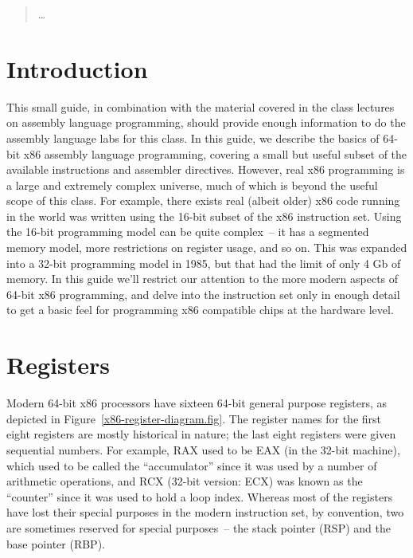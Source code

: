 \begin{quotation}
\ldots
\end{quotation}


\section{Introduction}

This small guide, in combination with the material covered in the
class lectures on assembly language programming, should provide enough
information to do the assembly language labs for this class. In this
guide, we describe the basics of 64-bit x86 assembly language
programming, covering a small but useful subset of the available
instructions and assembler directives. However, real x86 programming
is a large and extremely complex universe, much of which is beyond the
useful scope of this class. For example, there exists real (albeit
older) x86 code running in the world was written using the 16-bit
subset of the x86 instruction set. Using the 16-bit programming model
can be quite complex~-- it has a segmented memory model, more
restrictions on register usage, and so on. This was expanded into a
32-bit programming model in 1985, but that had the limit of only 4 Gb
of memory.  In this guide we'll restrict our attention to the more
modern aspects of 64-bit x86 programming, and delve into the
instruction set only in enough detail to get a basic feel for
programming x86 compatible chips at the hardware level.

\section{Registers}

Modern 64-bit x86 processors have sixteen 64-bit general purpose
registers, as depicted in Figure~\ref{x86-register-diagram.fig}. The
register names for the first eight registers are mostly historical in
nature; the last eight registers were given sequential numbers. For
example, RAX used to be EAX (in the 32-bit machine), which used to be
called the ``accumulator'' since it was used by a number of arithmetic
operations, and RCX (32-bit version: ECX) was known as the ``counter''
since it was used to hold a loop index. Whereas most of the registers
have lost their special purposes in the modern instruction set, by
convention, two are sometimes reserved for special purposes~-- the
stack pointer (RSP) and the base pointer (RBP).

